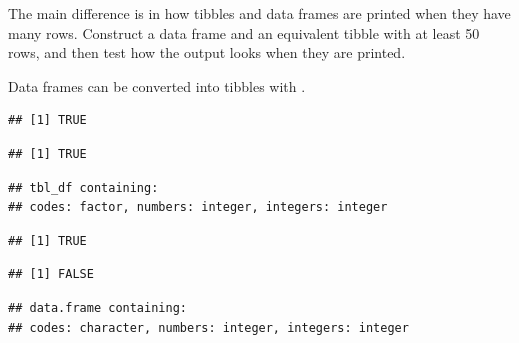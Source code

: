 \documentclass[krantz2]{krantz}\usepackage{knitr}%
\begin{document}
\begin{playground}
The main difference is in how tibbles and data frames are printed when they have many rows. Construct a data frame and an equivalent tibble with at least 50 rows, and then test how the output looks when they are printed.
\end{playground}

Data frames can be converted into tibbles with .

\begin{knitrout}\footnotesize
{}\color{fgcolor}\begin{kframe}
\begin{alltt}
 \hlkwb{<-} 
\end{alltt}
\begin{verbatim}
## [1] TRUE
\end{verbatim}
\begin{alltt}
\end{alltt}
\begin{verbatim}
## [1] TRUE
\end{verbatim}
\begin{alltt}
\end{alltt}
\begin{verbatim}
## tbl_df containing:
## codes: factor, numbers: integer, integers: integer
\end{verbatim}
\end{kframe}
\end{knitrout}

\begin{knitrout}\footnotesize
{}\color{fgcolor}\begin{kframe}
\begin{alltt}
 \hlkwb{<-} 
\end{alltt}
\begin{verbatim}
## [1] TRUE
\end{verbatim}
\begin{alltt}
\end{alltt}
\begin{verbatim}
## [1] FALSE
\end{verbatim}
\begin{alltt}
\end{alltt}
\begin{verbatim}
## data.frame containing:
## codes: character, numbers: integer, integers: integer
\end{verbatim}
\end{kframe}
\end{knitrout}
\end{document}
